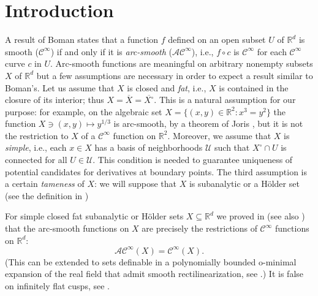 \documentclass[10pt, reqno]{amsart}
\theoremstyle{plain}
\theoremstyle{definition}
\numberwithin{equation}{section}
\def\R{\mathbb{R}}
\def\cC{\mathcal{C}}
\def\sU{\mathscr{U}}
\renewcommand{\o}{\circ}
\def\ol{\overline}
\def\AS{\mathcal{AC}^\infty}
\begin{document}
\maketitle



\section{Introduction}

A result of Boman \cite{Boman67} states that a function $f$ defined on an open subset $U$ of $\R^d$ is smooth ($\cC^\infty$) if and only if it is \emph{arc-smooth} ($\AS$), i.e., 
$f \o c$ is $\cC^\infty$ for each $\cC^\infty$ curve $c$ in $U$. Arc-smooth functions are meaningful on arbitrary nonempty subsets $X$ of $\R^d$ but a few assumptions 
are necessary in order to expect a result similar to Boman's. 
Let us assume that $X$ is closed and \emph{fat}, i.e., 
$X$ is contained in the closure of its interior; 
thus $X = \ol X = \ol{X^\o}$.
This is a natural assumption for our purpose:
for example, on the algebraic set $X=\{(x,y) \in \R^2 : x^3 = y^2\}$ the function 
$X \ni (x,y) \mapsto y^{1/3}$ is arc-smooth, by a theorem of Joris \cite{Joris82}, but it is not the restriction to $X$ of a $\cC^\infty$ function on $\R^2$. 
Moreover, we assume that $X$ is \emph{simple}, i.e., each $x \in X$ has a basis of neighborhoods $\sU$ such that $X^\o \cap U$ is connected for all $U \in \sU$.
This condition is needed to guarantee uniqueness of potential candidates for derivatives at boundary points.
The third assumption is a certain \emph{tameness} of $X$: we will suppose that $X$ is subanalytic or a H\"older set (see the definition in ) 


For simple closed fat subanalytic or H\"older sets $X \subseteq \R^d$ we proved in \cite{Rainer18} (see also \cite{Rainer:2021tr}) 
that the arc-smooth functions on $X$ are precisely the restrictions of $\cC^\infty$ functions on $\R^d$:
\begin{equation} \label{e:AS}
    \AS(X) = \cC^\infty(X).
\end{equation}
(This can be extended to sets definable in a polynomially bounded o-minimal expansion of the real field that admit smooth rectilinearization, see \cite{Rainer:2021tr}.)
It is false on infinitely flat cusps, see \cite[Example 10.4]{Rainer18}. 
\end{document}
